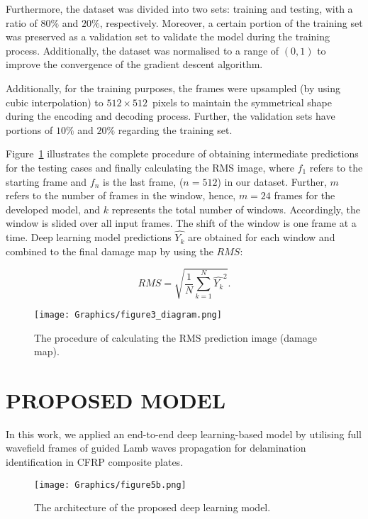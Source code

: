 \documentclass{IOS-Book-Article}
\begin{document}
Furthermore, the dataset was divided into two sets: training and testing, with a ratio of \(80\%\) and \(20\% \), respectively.
Moreover, a certain portion of the training set was preserved as a validation set to validate the model during the training process.
Additionally, the dataset was normalised to a range of \((0, 1)\) to improve the convergence of the gradient descent algorithm.

Additionally, for the training purposes, the frames were upsampled  (by using cubic interpolation) to \(512\times512\)~pixels to maintain the symmetrical shape during the encoding and decoding process.
Further, the validation sets have portions of \(10\%\) and \(20\%\) regarding the training set.

Figure~\ref{fig:Diagram_exp_predictions} illustrates the complete procedure of obtaining intermediate predictions for the testing cases and finally calculating the RMS image, where \(f_{1}\) refers to the starting frame and \(f_{n}\) is the last frame, (\(n=512\)) in our dataset.
Further, \(m\) refers to the number of frames in the window, hence, \(m=24\) frames for the developed model, and \(k\) represents the total number of windows.
Accordingly, the window is slided over all input frames.
The shift of the window is one frame at a time.
Deep learning model predictions \(\hat{Y_k}\) are obtained for each window and combined to the final damage map by using the $RMS$:

\begin{equation}
	RMS = \sqrt{\frac{1}{N}\sum_{k=1}^{N}\hat{Y_k}^2}.	
	\label{RMS}
\end{equation}
\begin{figure}[!h]
	\centering
	\texttt{[image: Graphics/figure3\_diagram.png]}
	\caption{The procedure of calculating the RMS prediction image (damage map).}
	\label{fig:Diagram_exp_predictions}
\end{figure}
\section{PROPOSED MODEL}\label{sec:section4}
In this work, we applied an end-to-end deep learning-based model by utilising 
full wavefield frames of guided Lamb waves propagation for delamination 
identification in CFRP composite plates.
\begin{figure} [h!]
	\begin{center}
		\texttt{[image: Graphics/figure5b.png]}
	\end{center}
	\caption{The architecture of the proposed deep learning model.} 
	\label{fig:AE_convlstm}
\end{figure}
\end{document}
